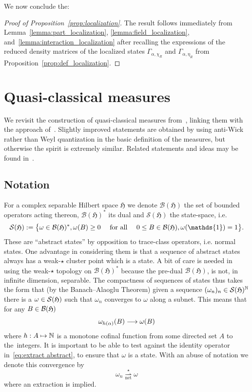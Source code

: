 \documentclass[10pt]{amsart}
\theoremstyle{definition}\newtheorem{defi}[theo]{Definition}\newtheorem{rema}[theo]{Remark}\newtheorem{exam}[theo]{Example}\newtheorem{exem}[theo]{Example}\newtheorem{nota}[theo]{Notation}
\newcommand{\cS}{\mathcal{S}}
\newcommand{\bN}{\mathbb{N}}
\newcommand{\gH}{\mathfrak{H}}
\newcommand{\cB}{\mathcal{B}}
\newcommand{\1}{\mathds{1}}
\newcommand{\cvnet}{\overset{\star}{\underset{\mathrm{net}}{\rightharpoonup}}}
\let\oldin\in
\renewcommand{\in}{\mathchoice{\oldin}{\oldin}{\,\oldin\,}{\,\oldin\,}}
\renewcommand*{\to}{\mathchoice{\longrightarrow}{\rightarrow}{\rightarrow}{\rightarrow}}
\let\oldmapsto\mapsto
\renewcommand*{\mapsto}{\mathchoice{\longmapsto}{\oldmapsto}{\oldmapsto}{\oldmapsto}}
\begin{document}
We now conclude the:
\begin{proof}[Proof of Proposition~\ref{prop:localization}]
The result follows immediately from Lemma~\ref{lemma:part_localization}, \ref{lemma:field_localization}, and~\ref{lemma:interaction_localization} after recalling the expressions of the reduced density matrices of the localized states $\Gamma_{\alpha,\chi_R}$ and $\Gamma_{\alpha,\eta_R}$ from Proposition~\ref{prop:def_localization}.
\end{proof}

\section{Quasi-classical measures} \label{sect:deF}

We revisit the construction of quasi-classical measures from~\cite{CorFalOli-20,CorFalOli-19,Falconi-18b,Falconi-18a}, linking them with the approach of~\cite{LewNamRou-14d}. Slightly improved statements are obtained by using anti-Wick rather than Weyl quantization in the basic definition of the measures, but otherwise the spirit is extremely similar. Related statements and ideas may be found in~\cite{FanLewVer-88}.

\subsection{Notation}

For a complex separable Hilbert space $\gH$ we denote $\cB (\gH)$ the set of bounded operators acting thereon, $\cB (\gH)^*$ its dual and $\cS (\gH)$ the state-space, i.e.
\begin{equation}\label{eq:states}
\cS (\gH) := \bigl\{ \omega \in \cB (\gH)^*, \omega (B) \geq 0\quad \text{ for all }\quad 0 \leq B \in \cB (\gH), \omega (\1) = 1 \bigr\}.
\end{equation}
These are ``abstract states'' by opposition to trace-class operators, i.e. normal states. One advantage in considering them is that a sequence of abstract states always has a weak-$\star$ cluster point which is a state. A bit of care is needed in using the weak-$\star$ topology on $\cB (\gH)^*$ because the pre-dual $\cB (\gH)$, is not, in infinite dimension, separable. The compactness of sequences of states thus takes the form that (by the Banach--Alaoglu Theorem) given a sequence $(\omega_n)_n\in \cS (\gH)^\bN$ there is a $\omega\in \cS (\gH)$ such that $\omega_n$ converges to $\omega$ along a subnet. This means that for any $B\in \cB(\gH)$
\begin{equation}\label{eq:extract abstract}
\omega_{h(\alpha)} (B) \to \omega (B)
\end{equation}
where $h:A\mapsto \bN$ is a monotone cofinal function from some directed set $A$ to the~integers. It is important to be able to test against the identity operator in~\eqref{eq:extract abstract}, to ensure that $\omega$ is a state. With an abuse of notation we denote this convergence by
\begin{equation}\label{eq:CV net}
\omega_n \cvnet \omega
\end{equation}
where an extraction is implied.
\end{document}
